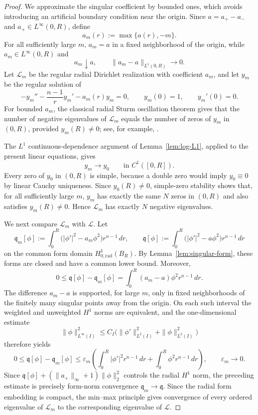 \documentclass[11pt]{article}
\begin{document}
\begin{proof}
{We approximate the singular coefficient by bounded ones, which avoids
introducing an artificial boundary condition near the origin.  Since
$a=a_+-a_-$ and $a_+\in L^\infty(0,R)$, define
\[
 a_m(r):=\max\{a(r),-m\}.
\]
For all sufficiently large $m$, $a_m=a$ in a fixed neighborhood of the
origin, while $a_m\in L^\infty(0,R)$ and
\[
 a_m\downarrow a,\qquad \|a_m-a\|_{L^1(0,R)}\longrightarrow0.
\]
Let $\mathcal L_m$ be the regular radial Dirichlet realization with
coefficient $a_m$, and let $y_m$ be the regular solution of
\[
 -y_m''-\frac{n-1}{r}y_m'-a_m(r)y_m=0,
 \qquad y_m(0)=1,\qquad y_m'(0)=0.
\]
For bounded $a_m$, the classical radial Sturm oscillation theorem gives that
the number of negative eigenvalues of $\mathcal L_m$ equals the number of
zeros of $y_m$ in $(0,R)$, provided $y_m(R)\ne0$; see, for example,
\cite{Titchmarsh}.

The $L^1$ continuous-dependence argument of Lemma~\ref{lem:log-L1}, applied
to the present linear equations, gives
\[
 y_m\longrightarrow y_0\qquad\text{in }C^1([0,R]).
\]
Every zero of $y_0$ in $(0,R)$ is simple, because a double zero would imply
$y_0\equiv0$ by linear Cauchy uniqueness.  Since $y_0(R)\ne0$, simple-zero
stability shows that, for all sufficiently large $m$, $y_m$ has exactly the
same $N$ zeros in $(0,R)$ and also satisfies $y_m(R)\ne0$.  Hence
$\mathcal L_m$ has exactly $N$ negative eigenvalues.

We next compare $\mathcal L_m$ with $\mathcal L$.  Let
\[
 \mathfrak q_m[\phi]
 :=\int_0^R\bigl(|\phi'|^2-a_m\phi^2\bigr)r^{n-1}\,dr,
 \qquad
 \mathfrak q[\phi]
 :=\int_0^R\bigl(|\phi'|^2-a\phi^2\bigr)r^{n-1}\,dr
\]
on the common form domain $H^1_{0,\mathrm{rad}}(B_R)$.  By
Lemma~\ref{lem:singular-form}, these forms are closed and have a common lower
bound.  Moreover,
\[
 0\le \mathfrak q[\phi]-\mathfrak q_m[\phi]
 =\int_0^R(a_m-a)\phi^2r^{n-1}\,dr.
\]
The difference $a_m-a$ is supported, for large $m$, only in fixed
neighborhoods of the finitely many singular points away from the origin.
On each such interval the weighted and unweighted $H^1$ norms are
equivalent, and the one-dimensional estimate
\[
 \|\phi\|_{L^\infty(I)}^2
 \le C_I\bigl(\|\phi'\|_{L^2(I)}^2+\|\phi\|_{L^2(I)}^2\bigr)
\]
therefore yields
\[
 0\le \mathfrak q[\phi]-\mathfrak q_m[\phi]
 \le \varepsilon_m
 \left(
 \int_0^R|\phi'|^2r^{n-1}\,dr+
 \int_0^R\phi^2r^{n-1}\,dr
 \right),
 \qquad \varepsilon_m\to0.
\]
{Since
$\mathfrak q[\phi]+(\|a_+\|_\infty+1)\|\phi\|_2^2$ controls the radial
$H^1$ norm, the preceding estimate is precisely form-norm convergence
$\mathfrak q_m\to\mathfrak q$.}  Since the radial form embedding is compact,
the min--max principle gives convergence of every ordered eigenvalue of
$\mathcal L_m$ to the corresponding eigenvalue of $\mathcal L$.

}
\end{proof}
\end{document}
